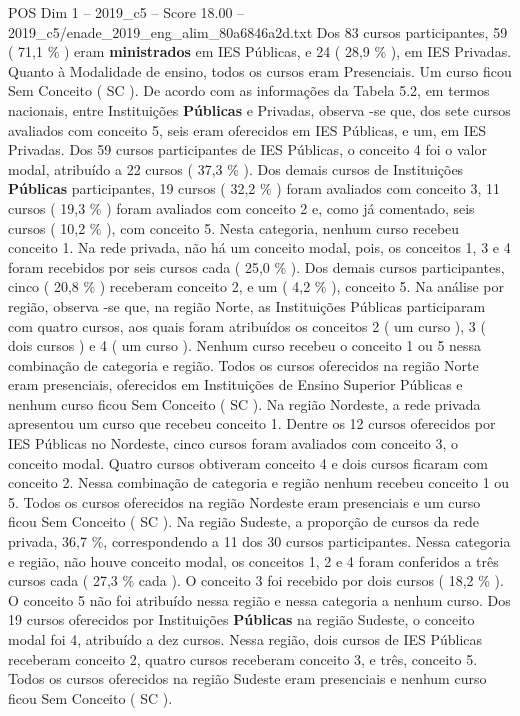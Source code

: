 \begin{textsample}{POS Dim 1 – 2019\_c5 – Score 18.00 – 2019\_c5/enade\_2019\_eng\_alim\_80a6846a2d.txt}
Dos 83 cursos participantes, 59 ( 71,1 \% ) eram \textbf{ministrados} em IES Públicas, e 24 ( 28,9 \% ), em IES Privadas.
Quanto à Modalidade de ensino, todos os cursos eram Presenciais.
Um curso ficou Sem Conceito ( SC ).
De acordo com as informações da Tabela 5.2, em termos nacionais, entre Instituições \textbf{Públicas} e Privadas, observa -se que, dos sete cursos avaliados com conceito 5, seis eram oferecidos em IES Públicas, e um, em IES Privadas.
Dos 59 cursos participantes de IES Públicas, o conceito 4 foi o valor modal, atribuído a 22 cursos ( 37,3 \% ).
Dos demais cursos de Instituições \textbf{Públicas} participantes, 19 cursos ( 32,2 \% ) foram avaliados com conceito 3, 11 cursos ( 19,3 \% ) foram avaliados com conceito 2 e, como já comentado, seis cursos ( 10,2 \% ), com conceito 5.
Nesta categoria, nenhum curso recebeu conceito 1.
Na rede privada, não há um conceito modal, pois, os conceitos 1, 3 e 4 foram recebidos por seis cursos cada ( 25,0 \% ).
Dos demais cursos participantes, cinco ( 20,8 \% ) receberam conceito 2, e um ( 4,2 \% ), conceito 5.
Na análise por região, observa -se que, na região Norte, as Instituições Públicas participaram com quatro cursos, aos quais foram atribuídos os conceitos 2 ( um curso ), 3 ( dois cursos ) e 4 ( um curso ).
Nenhum curso recebeu o conceito 1 ou 5 nessa combinação de categoria e região.
Todos os cursos oferecidos na região Norte eram presenciais, oferecidos em Instituições de Ensino Superior Públicas e nenhum curso ficou Sem Conceito ( SC ).
Na região Nordeste, a rede privada apresentou um curso que recebeu conceito 1.
Dentre os 12 cursos oferecidos por IES Públicas no Nordeste, cinco cursos foram avaliados com conceito 3, o conceito modal.
Quatro cursos obtiveram conceito 4 e dois cursos ficaram com conceito 2.
Nessa combinação de categoria e região nenhum recebeu conceito 1 ou 5.
Todos os cursos oferecidos na região Nordeste eram presenciais e um curso ficou Sem Conceito ( SC ).
Na região Sudeste, a proporção de cursos da rede privada, 36,7 \%, correspondendo a 11 dos 30 cursos participantes.
Nessa categoria e região, não houve conceito modal, os conceitos 1, 2 e 4 foram conferidos a três cursos cada ( 27,3 \% cada ).
O conceito 3 foi recebido por dois cursos ( 18,2 \% ).
O conceito 5 não foi atribuído nessa região e nessa categoria a nenhum curso.
Dos 19 cursos oferecidos por Instituições \textbf{Públicas} na região Sudeste, o conceito modal foi 4, atribuído a dez cursos.
Nessa região, dois cursos de IES Públicas receberam conceito 2, quatro cursos receberam conceito 3, e três, conceito 5.
Todos os cursos oferecidos na região Sudeste eram presenciais e nenhum curso ficou Sem Conceito ( SC ).

\end{textsample}
